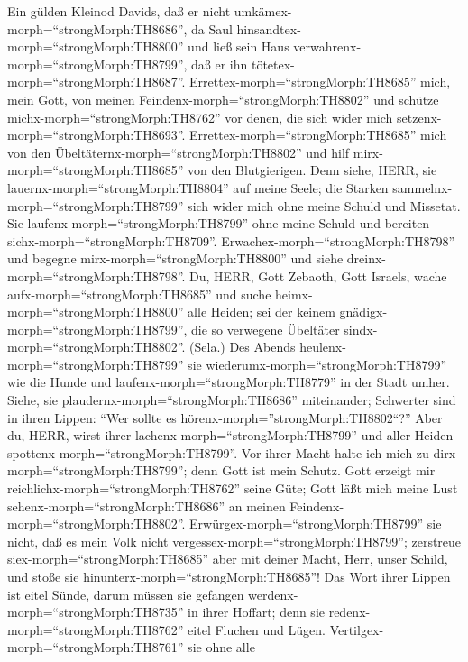  Ein gülden Kleinod Davids, daß er nicht
umkämex-morph=``strongMorph:TH8686'', da Saul
hinsandtex-morph=``strongMorph:TH8800'' und ließ sein Haus
verwahrenx-morph=``strongMorph:TH8799'', daß er ihn
tötetex-morph=``strongMorph:TH8687''.
Errettex-morph=``strongMorph:TH8685'' mich, mein Gott, von meinen
Feindenx-morph=``strongMorph:TH8802'' und schütze
michx-morph=``strongMorph:TH8762'' vor denen, die sich wider mich
setzenx-morph=``strongMorph:TH8693''. 
Errettex-morph=``strongMorph:TH8685'' mich von den
Übeltäternx-morph=``strongMorph:TH8802'' und hilf
mirx-morph=``strongMorph:TH8685'' von den Blutgierigen. 
Denn siehe, HERR, sie lauernx-morph=``strongMorph:TH8804'' auf meine
Seele; die Starken sammelnx-morph=``strongMorph:TH8799'' sich wider mich
ohne meine Schuld und Missetat.  Sie
laufenx-morph=``strongMorph:TH8799'' ohne meine Schuld und bereiten
sichx-morph=``strongMorph:TH8709''.
Erwachex-morph=``strongMorph:TH8798'' und begegne
mirx-morph=``strongMorph:TH8800'' und siehe
dreinx-morph=``strongMorph:TH8798''.  Du, HERR, Gott
Zebaoth, Gott Israels, wache aufx-morph=``strongMorph:TH8685'' und suche
heimx-morph=``strongMorph:TH8800'' alle Heiden; sei der keinem
gnädigx-morph=``strongMorph:TH8799'', die so verwegene Übeltäter
sindx-morph=``strongMorph:TH8802''. (Sela.)  Des Abends
heulenx-morph=``strongMorph:TH8799'' sie
wiederumx-morph=``strongMorph:TH8799'' wie die Hunde und
laufenx-morph=``strongMorph:TH8779'' in der Stadt umher. 
Siehe, sie plaudernx-morph=``strongMorph:TH8686'' miteinander; Schwerter
sind in ihren Lippen: ``Wer sollte es
hörenx-morph=''strongMorph:TH8802``?''  Aber du, HERR, wirst
ihrer lachenx-morph=``strongMorph:TH8799'' und aller Heiden
spottenx-morph=``strongMorph:TH8799''.  Vor ihrer Macht
halte ich mich zu dirx-morph=``strongMorph:TH8799''; denn Gott ist mein
Schutz.  Gott erzeigt mir
reichlichx-morph=``strongMorph:TH8762'' seine Güte; Gott läßt mich meine
Lust sehenx-morph=``strongMorph:TH8686'' an meinen
Feindenx-morph=``strongMorph:TH8802''. 
Erwürgex-morph=``strongMorph:TH8799'' sie nicht, daß es mein Volk nicht
vergessex-morph=``strongMorph:TH8799''; zerstreue
siex-morph=``strongMorph:TH8685'' aber mit deiner Macht, Herr, unser
Schild, und stoße sie hinunterx-morph=``strongMorph:TH8685''!
 Das Wort ihrer Lippen ist eitel Sünde, darum müssen sie
gefangen werdenx-morph=``strongMorph:TH8735'' in ihrer Hoffart; denn sie
redenx-morph=``strongMorph:TH8762'' eitel Fluchen und Lügen.
 Vertilgex-morph=``strongMorph:TH8761'' sie ohne alle
